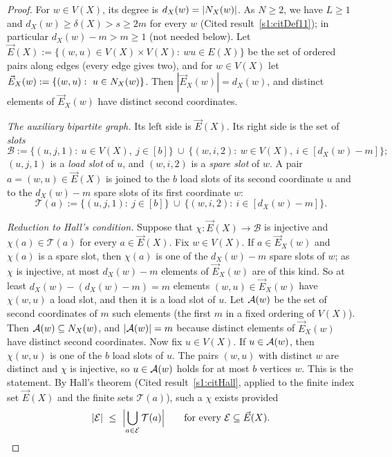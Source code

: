 \begin{proof}
For $w\in V(X)$, its degree is $d_X(w)=|N_X(w)|$. As $N\ge2$, we have
$L\ge1$ and $d_X(w)\ge\delta(X)>s\ge2m$ for every $w$ (Cited
result~\ref{s1:citDef11}); in particular $d_X(w)-m>m\ge1$ (not needed
below). Let
$\vec E(X):=\{(w,u)\in V(X)\times V(X):\ wu\in E(X)\}$ be the set of
ordered pairs along edges (every edge gives two), and for $w\in V(X)$ let
$\vec E_X(w):=\{(w,u):\ u\in\Nbr_X(w)\}$. Then $|\vec E_X(w)|=d_X(w)$, and
distinct elements of $\vec E_X(w)$ have distinct second coordinates.

\emph{The auxiliary bipartite graph.} Its left side is $\vec E(X)$. Its
right side is the set of \emph{slots}
\[
\mathcal B:=\{(u,j,1):\ u\in V(X),\ j\in[b]\}\ \cup\
\{(w,i,2):\ w\in V(X),\ i\in[d_X(w)-m]\} ;
\]
$(u,j,1)$ is a \emph{load slot} of $u$, and $(w,i,2)$ is a \emph{spare
slot} of $w$. A pair $a=(w,u)\in\vec E(X)$ is joined to the $b$ load slots
of its second coordinate $u$ and to the $d_X(w)-m$ spare slots of its first
coordinate $w$:
\[
\mathcal T(a):=\{(u,j,1):\ j\in[b]\}\ \cup\ \{(w,i,2):\ i\in[d_X(w)-m]\}.
\]

\emph{Reduction to Hall's condition.} Suppose that
$\chi:\vec E(X)\to\mathcal B$ is injective and $\chi(a)\in\mathcal T(a)$ for
every $a\in\vec E(X)$. Fix $w\in V(X)$. If $a\in\vec E_X(w)$ and $\chi(a)$ is
a spare slot, then $\chi(a)$ is one of the $d_X(w)-m$ spare slots of $w$; as
$\chi$ is injective, at most $d_X(w)-m$ elements of $\vec E_X(w)$ are of
this kind. So at least $d_X(w)-(d_X(w)-m)=m$ elements
$(w,u)\in\vec E_X(w)$ have $\chi(w,u)$ a load slot, and then it is a load
slot of $u$. Let $\mathcal{A}(w)$ be the set of second coordinates of $m$ such
elements (the first $m$ in a fixed ordering of $V(X)$). Then
$\mathcal{A}(w)\subseteq N_X(w)$, and $|\mathcal{A}(w)|=m$ because distinct elements of
$\vec E_X(w)$ have distinct second coordinates. Now fix $u\in V(X)$. If
$u\in\mathcal{A}(w)$, then $\chi(w,u)$ is one of the $b$ load slots of $u$. The
pairs $(w,u)$ with distinct $w$ are distinct and $\chi$ is injective, so
$u\in\mathcal{A}(w)$ holds for at most $b$ vertices $w$. This is the statement. By
Hall's theorem (Cited result~\ref{s1:citHall}, applied to the finite index
set $\vec E(X)$ and the finite sets $\mathcal T(a)$), such a $\chi$ exists
provided
\begin{equation}\label{s3:eqHBhall}
|\mathcal E|\ \le\ \Bigl|\bigcup_{a\in\mathcal E}\mathcal T(a)\Bigr|\qquad\text{for every }\mathcal E\subseteq\vec E(X).
\end{equation}


\end{proof}
